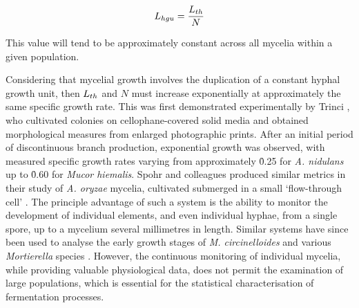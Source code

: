 \begin{equation}
	L_{hgu} = \frac{L_{th}}{N}
\end{equation}

\noindent This value will tend to be approximately constant across all mycelia within a given population.

Considering that  mycelial growth involves the duplication of a constant hyphal growth unit, then $L_{th}$ and $N$ must increase exponentially at approximately the same specific growth rate. This was first demonstrated experimentally by Trinci \cite{trinci1974}, who cultivated colonies on cellophane-covered solid media and obtained morphological measures from enlarged photographic prints. After an initial period of discontinuous branch production, exponential growth was observed, with measured specific growth rates varying from approximately \h{0.25} for \emph{A. nidulans} up to \h{0.60} for \emph{Mucor hiemalis}. Spohr and colleagues produced similar metrics in their study of \emph{A. oryzae} mycelia, cultivated submerged in a small \lq flow-through cell' \cite{spohr1998}. The principle advantage of such a system is the ability to monitor the development of individual elements, and even individual hyphae, from a single spore, up to a mycelium several millimetres in length. Similar systems have since been used to analyse the early growth stages of \emph{M. circinelloides} \cite{lubbehusen2003,lubbehusen2004} and various \emph{Mortierella} species \cite{eypark2002,eypark2006}. However, the continuous monitoring of individual mycelia, while providing valuable physiological data, does not permit the examination of large populations, which is essential for the statistical characterisation of fermentation processes.


